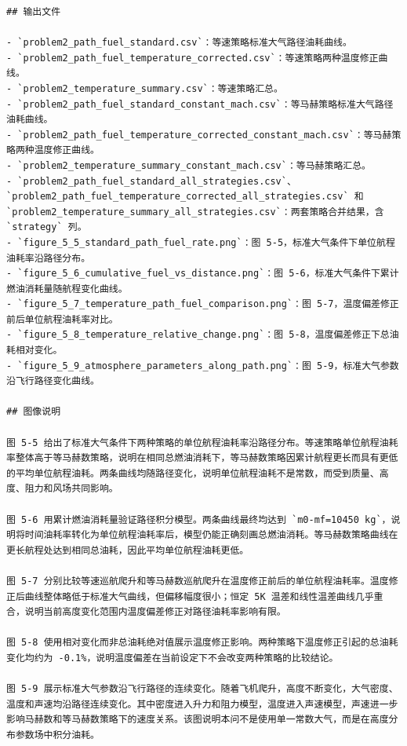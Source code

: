 \documentclass[withoutpreface,bwprint]{cumcmthesis} %
\begin{document}
\begin{center}
\begin{lstlisting}
## 输出文件

- `problem2_path_fuel_standard.csv`：等速策略标准大气路径油耗曲线。
- `problem2_path_fuel_temperature_corrected.csv`：等速策略两种温度修正曲线。
- `problem2_temperature_summary.csv`：等速策略汇总。
- `problem2_path_fuel_standard_constant_mach.csv`：等马赫策略标准大气路径油耗曲线。
- `problem2_path_fuel_temperature_corrected_constant_mach.csv`：等马赫策略两种温度修正曲线。
- `problem2_temperature_summary_constant_mach.csv`：等马赫策略汇总。
- `problem2_path_fuel_standard_all_strategies.csv`、`problem2_path_fuel_temperature_corrected_all_strategies.csv` 和 `problem2_temperature_summary_all_strategies.csv`：两套策略合并结果，含 `strategy` 列。
- `figure_5_5_standard_path_fuel_rate.png`：图 5-5，标准大气条件下单位航程油耗率沿路径分布。
- `figure_5_6_cumulative_fuel_vs_distance.png`：图 5-6，标准大气条件下累计燃油消耗量随航程变化曲线。
- `figure_5_7_temperature_path_fuel_comparison.png`：图 5-7，温度偏差修正前后单位航程油耗率对比。
- `figure_5_8_temperature_relative_change.png`：图 5-8，温度偏差修正下总油耗相对变化。
- `figure_5_9_atmosphere_parameters_along_path.png`：图 5-9，标准大气参数沿飞行路径变化曲线。

## 图像说明

图 5-5 给出了标准大气条件下两种策略的单位航程油耗率沿路径分布。等速策略单位航程油耗率整体高于等马赫数策略，说明在相同总燃油消耗下，等马赫数策略因累计航程更长而具有更低的平均单位航程油耗。两条曲线均随路径变化，说明单位航程油耗不是常数，而受到质量、高度、阻力和风场共同影响。

图 5-6 用累计燃油消耗量验证路径积分模型。两条曲线最终均达到 `m0-mf=10450 kg`，说明将时间油耗率转化为单位航程油耗率后，模型仍能正确刻画总燃油消耗。等马赫数策略曲线在更长航程处达到相同总油耗，因此平均单位航程油耗更低。

图 5-7 分别比较等速巡航爬升和等马赫数巡航爬升在温度修正前后的单位航程油耗率。温度修正后曲线整体略低于标准大气曲线，但偏移幅度很小；恒定 5K 温差和线性温差曲线几乎重合，说明当前高度变化范围内温度偏差修正对路径油耗率影响有限。

图 5-8 使用相对变化而非总油耗绝对值展示温度修正影响。两种策略下温度修正引起的总油耗变化均约为 -0.1%，说明温度偏差在当前设定下不会改变两种策略的比较结论。

图 5-9 展示标准大气参数沿飞行路径的连续变化。随着飞机爬升，高度不断变化，大气密度、温度和声速均沿路径连续变化。其中密度进入升力和阻力模型，温度进入声速模型，声速进一步影响马赫数和等马赫数策略下的速度关系。该图说明本问不是使用单一常数大气，而是在高度分布参数场中积分油耗。


\end{lstlisting}
\end{center}
\end{document}
